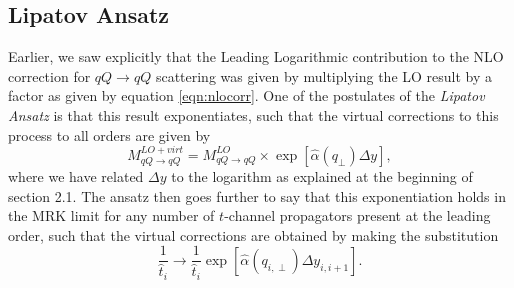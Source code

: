 \subsection{Lipatov Ansatz}

Earlier, we saw explicitly that the Leading Logarithmic contribution to the NLO correction for $qQ \to qQ$ scattering was given by multiplying the LO result by a factor as given by equation \ref{eqn:nlocorr}. One of the postulates of the \emph{Lipatov Ansatz} is that this result exponentiates, such that the virtual corrections to this process to all orders are given by
\begin{equation}
M_{qQ \to qQ}^{LO + virt} = M_{qQ \to qQ}^{LO} \times \exp \left[\hat{\alpha}(q_\perp) \Delta y \right],
\end{equation}
where we have related $\Delta y$ to the logarithm as explained at the beginning of section 2.1. The ansatz then goes further to say that this exponentiation holds in the MRK limit for any number of $t$-channel propagators present at the leading order, such that the virtual corrections are obtained by making the substitution
\begin{equation}
\frac{1}{\hat{t}_i} \to \frac{1}{\hat{t}_i} \exp \left[\hat{\alpha}(q_{i,\perp}) \Delta y_{i,i+1} \right].
\label{eqn:lipansatz}
\end{equation}
